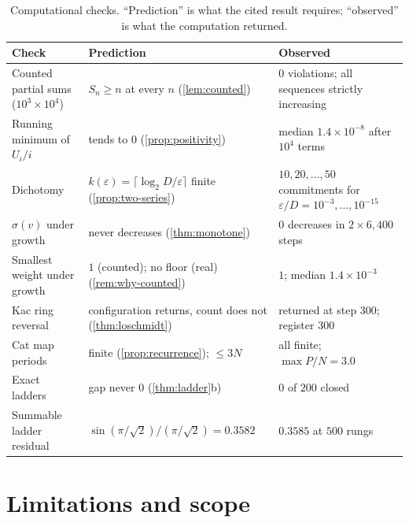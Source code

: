\documentclass[10pt,twocolumn,a4paper]{article}
\newcommand{\sep}{\sigma}
\begin{document}
\begin{table}[t]
\centering
\small
\caption{Computational checks. ``Prediction'' is what the cited result
requires; ``observed'' is what the computation returned.}
\label{tab:validation}
\begin{tabular}{@{}p{3.4cm}p{4.6cm}p{5.6cm}@{}}
\toprule
Check & Prediction & Observed\\
\midrule
Counted partial sums ($10^3\times10^4$) & $S_n\ge n$ at every $n$
(\cref{lem:counted}) & $0$ violations; all sequences strictly increasing\\
Running minimum of $U_i/i$ & tends to $0$ (\cref{prop:positivity}) & median
$1.4\times10^{-8}$ after $10^4$ terms\\
Dichotomy & $k(\varepsilon)=\lceil\log_2 D/\varepsilon\rceil$ finite
(\cref{prop:two-series}) & $10,20,\dots,50$ commitments for
$\varepsilon/D=10^{-3},\dots,10^{-15}$\\
$\sep(v)$ under growth & never decreases (\cref{thm:monotone}) & $0$
decreases in $2\times6{,}400$ steps\\
Smallest weight under growth & $1$ (counted); no floor (real)
(\cref{rem:why-counted}) & $1$; median $1.4\times10^{-3}$\\
Kac ring reversal & configuration returns, count does not
(\cref{thm:loschmidt}) & returned at step $300$; register $300$\\
Cat map periods & finite (\cref{prop:recurrence}); $\le3N$~\citep{dyson1992} &
all finite; $\max P/N=3.0$\\
Exact ladders & gap never $0$ (\cref{thm:ladder}b) & $0$ of $200$ closed\\
Summable ladder residual & $\sin(\pi/\sqrt2)/(\pi/\sqrt2)=0.3582$ &
$0.3585$ at $500$ rungs\\
\bottomrule
\end{tabular}
\end{table}

\section{Limitations and scope}
\label{sec:limits}
\end{document}
